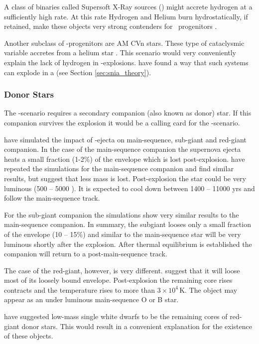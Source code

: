 A class of binaries called Supersoft X-Ray sources (\sss) might accrete hydrogen at a sufficiently high rate. At this rate Hydrogen and Helium burn hydrostatically, if retained, make these objects very strong contenders for \snia\ progenitors \citep[][and references therein]{2006astro.ph..6364D}. 
 
Another subclass of \sd-progenitors are AM CVn stars. These type of cataclysmic variable accretes from a helium star \cite{1992A&A...262...97V}. This scenario would very conveniently explain the lack of hydrogen in \snia-explosions. \citet[][]{2010A&A...514A..53F} have found a way that such systems can explode in a \snia (see Section \ref{sec:snia_theory}).


\subsubsection{Donor Stars}
The \sd-scenario requires a secondary companion (also known as donor) star. If this companion survives the explosion it would be a calling card for the \sd-scenario. 

\citet{2000ApJS..128..615M} have simulated the impact of \snia-ejecta on main-sequence, sub-giant and red-giant companion. In the case of the main-sequence companion the supernova ejecta heats a small fraction (1-2\%) of the envelope which is lost post-explosion. \citet{2008A&A...489..943P} have repeated the simulations for the main-sequence companion and find similar results, but suggest that less mass is lost. Post-explosion the star could be very luminous (500 -- 5000 \lsun). It is expected to cool down between 1400 -- 11000 yrs and follow the main-sequence track. 

For the sub-giant companion the simulations show very similar results to the main-sequence companion. In summary, the subgiant looses only a small fraction of the envelope (10 -- 15\%) and similar to the main-sequence star will be very luminous shortly after the explosion. After thermal equilibrium is established the companion will return to a post-main-sequence track. 

The case of the red-giant, however, is very different. \citet{2000ApJS..128..615M} suggest that it will loose most of its loosely bound envelope. Post-explosion the remaining core rises contracts and the temperature rises to more than $3 \times 10^4$\,K. The object may appear as an under luminous main-sequence O or B star. 


\cite{2009A&A...493.1081J} have suggested low-mass single white dwarfs to be the remaining cores of red-giant donor stars. This would result in a convenient explanation for the existence of these objects. 


